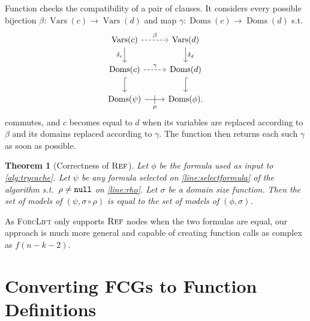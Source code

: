 \documentclass{article}
\newtheorem{theorem}{Theorem}
\newcommand{\nulll}{\texttt{\textup{null}}}
\DeclareMathOperator{\Reff}{\textsc{Ref}}
\DeclareMathOperator{\Doms}{Doms}
\DeclareMathOperator{\Vars}{Vars}
\begin{document}
Function \generateMaps checks the compatibility of a pair of clauses. It
considers every possible bijection $\beta\colon \Vars(c) \to \Vars(d)$ and map
$\gamma\colon \Doms(c) \to \Doms(d)$ s.t.
\[
  \begin{tikzcd}
    \Vars(c) \ar[r, dashed, "\beta"] \arrow[d, swap, "\delta_c"] & \Vars(d) \ar[d, "\delta_d"] \\
    \Doms(c) \ar[r, dashed, "\gamma"] \ar[d, hookrightarrow] & \Doms(d) \ar[d, hookrightarrow] \\
    \Doms(\psi) \ar[r, swap, "\rho", "|" marking, outer sep=5pt] & \Doms(\phi).
  \end{tikzcd}
\]
commutes, and $c$ becomes equal to $d$ when its variables are replaced according
to $\beta$ and its domains replaced according to $\gamma$. The function then
returns each such $\gamma$ as soon as possible.

\begin{theorem}[Correctness of $\Reff$]
  Let $\phi$ be the formula used as input to \cref{alg:trycache}. Let $\psi$ be
  any formula selected on \cref{line:selectformula} of the algorithm s.t.\
  $\rho \ne \nulll$ on \cref{line:rho}. Let $\sigma$ be a domain size function.
  Then the set of models of $(\psi, \sigma \circ \rho)$ is equal to the set of
  models of $(\phi, \sigma)$.
\end{theorem}

As \textsc{ForcLift} only supports $\Reff$ nodes when the two formulas are
equal, our approach is much more general and capable of creating function calls
as complex as $f(n-k-2)$.

\section{Converting FCGs to Function Definitions}\label{sec:interpret}
\end{document}
